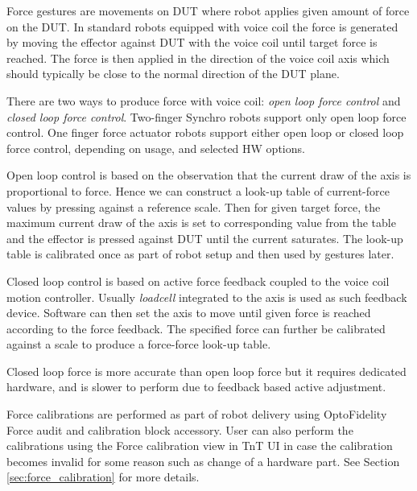 Force gestures are movements on DUT where robot applies given amount of force on the DUT. In standard robots equipped with voice coil the force is generated by moving the effector against DUT with the voice coil until target force is reached. The force is then applied in the direction of the voice coil axis which should typically be close to the normal direction of the DUT plane.

There are two ways to produce force with voice coil: \emph{open loop force control} and \emph{closed loop force control}. Two-finger Synchro robots support only open loop force control. One finger force actuator robots support either open loop or closed loop force control, depending on usage, and selected HW options.

Open loop control is based on the observation that the current draw of the axis is proportional to force. Hence we can construct a look-up table of current-force values by pressing against a reference scale. Then for given target force, the maximum current draw of the axis is set to corresponding value from the table and the effector is pressed against DUT until the current saturates. The look-up table is calibrated once as part of robot setup and then used by gestures later.


Closed loop control is based on active force feedback coupled to the voice coil motion controller. Usually \emph{loadcell} integrated to the axis is used as such feedback device.  Software can then set the axis to move until given force is reached according to the force feedback. The specified force can further be calibrated against a scale to produce a force-force look-up table.

Closed loop force is more accurate than open loop force but it requires dedicated hardware, and is slower to perform due to feedback based active adjustment.


Force calibrations are performed as part of robot delivery using OptoFidelity Force audit and calibration block accessory. User can also perform the calibrations using the Force calibration view in TnT UI in case the calibration becomes invalid for some reason such as change of a hardware part. See Section \ref{sec:force_calibration} for more details.

